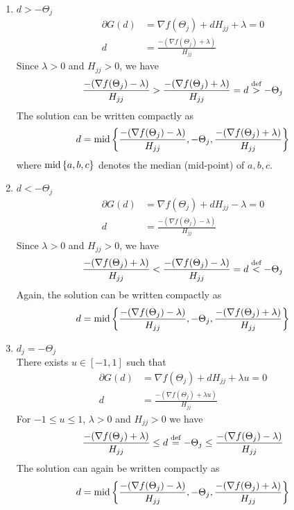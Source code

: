 \begin{enumerate}
	\item $d > -\Theta_j$
	\begin{align}
	\partial G(d) & = \nabla f(\Theta_{j}) + d H_{j j} + \lambda = 0 \nonumber \\
	d & = \frac{-(\nabla f(\Theta_{j}) + \lambda)}{H_{j j}}  \nonumber
	\end{align}
	Since $\lambda>0$ and $H_{jj}>0$, we have
	\begin{equation*}
	\frac{-(\nabla f(\Theta_{j}) - \lambda)}{H_{j j}} > \frac{-(\nabla f(\Theta_{j}) + \lambda)}{H_{j j}} = d \overset{\textrm{{def}}}{>} -\Theta_j
	\end{equation*}
	The solution can be written compactly as
	\begin{equation*}
	d = \textrm{{mid}}\left\lbrace \frac{-(\nabla f(\Theta_{j}) - \lambda)}{H_{j j}}, -\Theta_j ,\frac{-(\nabla f(\Theta_{j}) + \lambda)}{H_{j j}} \right\rbrace
	\end{equation*}
	where $\textrm{{mid}}\left\lbrace a,b,c \right\rbrace$ denotes the median (mid-point) of $a,b,c$.
	\item $d < -\Theta_j$
	\begin{align}
	\partial G(d) & = \nabla f(\Theta_{j}) + d H_{j j} - \lambda = 0 \nonumber \\
	d & = \frac{-(\nabla f(\Theta_{j}) - \lambda)}{H_{j j}}  \nonumber
	\end{align}
	Since $\lambda>0$ and $H_{jj}>0$, we have
	\begin{equation*}
	\frac{-(\nabla f(\Theta_{j}) + \lambda)}{H_{j j}} < \frac{-(\nabla f(\Theta_{j}) - \lambda)}{H_{j j}} = d \overset{\textrm{{def}}}{<} -\Theta_j
	\end{equation*}
	Again, the solution can be written compactly as
	\begin{equation*}
	d = \textrm{{mid}}\left\lbrace \frac{-(\nabla f(\Theta_{j}) - \lambda)}{H_{j j}}, -\Theta_j ,\frac{-(\nabla f(\Theta_{j}) + \lambda)}{H_{j j}} \right\rbrace
	\end{equation*}
	
	\item $d_j = -\Theta_j$\\
	There exists $u \in [-1,1]$ such that
	\begin{align*}
	\partial G(d) & = \nabla f(\Theta_{j}) + d H_{j j} + \lambda u = 0 \nonumber \\
	d & = \frac{-(\nabla f(\Theta_{j}) + \lambda u)}{H_{j j}}  \nonumber
	\end{align*}
	For $-1 \leq u \leq 1$, $\lambda>0$ and $H_{jj}>0$ we have
	\begin{equation*}
	\frac{-(\nabla f(\Theta_{j}) + \lambda)}{H_{j j}} \leq  d \overset{\textrm{{def}}}{=} -\Theta_j \leq \frac{-(\nabla f(\Theta_{j}) - \lambda)}{H_{j j}}
	\end{equation*}
	The solution can again be written compactly as
	\begin{equation*}
	d = \textrm{{mid}}\left\lbrace \frac{-(\nabla f(\Theta_{j}) - \lambda)}{H_{j j}}, -\Theta_j ,\frac{-(\nabla f(\Theta_{j}) + \lambda)}{H_{j j}} \right\rbrace
	\end{equation*}
	
\end{enumerate}
